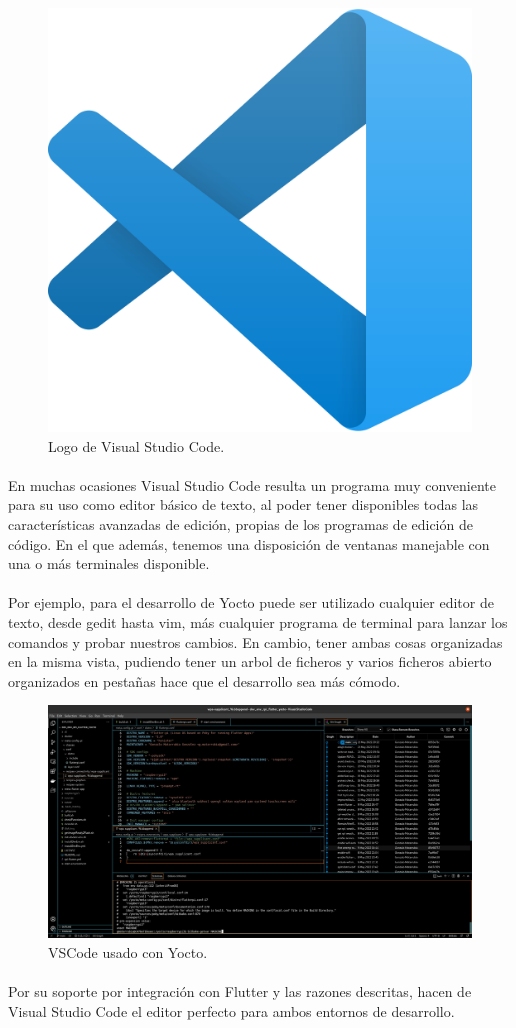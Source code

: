 \begin{figure}[H]
	\centering
	\includegraphics[width=0.30\linewidth]{imgs/vscode-logo}
	\caption[Visual Studio Code]{Logo de Visual Studio Code.}
	\label{fig:vscode-log}
\end{figure}

\paragraph{}En muchas ocasiones Visual Studio Code resulta un programa muy conveniente
para su uso como editor básico de texto, al poder tener disponibles todas las características
avanzadas de edición, propias de los programas de edición de código. En el que además,
tenemos una disposición de ventanas manejable con una o más terminales disponible.

\paragraph{}Por ejemplo, para el desarrollo de Yocto puede ser utilizado cualquier editor
de texto, desde gedit hasta vim, más cualquier programa de terminal para lanzar los
comandos y probar nuestros cambios. En cambio, tener ambas cosas organizadas en la misma
vista, pudiendo tener un arbol de ficheros y varios ficheros abierto organizados en pestañas
hace que el desarrollo sea más cómodo.


\begin{figure}[H]
	\centering
	\includegraphics[width=0.90\linewidth]{imgs/vscode-perspective}
	\caption[VSCode yocto]{VSCode usado con Yocto.}
	\label{fig:vscode-perpective}
\end{figure}

\paragraph{}Por su soporte por integración con Flutter y las razones descritas, hacen
de Visual Studio Code el editor perfecto para ambos entornos de desarrollo.


